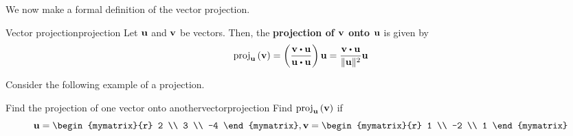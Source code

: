 We now make a formal definition of the vector projection.

\begin{definition}{Vector projection}{projection}
Let ${\bf u}$ and ${\bf v}$ be vectors. Then, the \textbf{projection of ${\bf v}$ onto
${\bf u}$} is given by 
\begin{equation*}
\func{proj}_{\vect{u}}\tup{\vect{v}} =\tup{\vspace{0.05in}
\frac{\vect{v}\dotprod \vect{u}}{\vect{u}\dotprod \vect{u}}} \vect{u}
=
\frac{\vect{v}\dotprod \vect{u}}{\norm{\vect{u}} ^{2}}\vect{u}
\end{equation*}
\end{definition}

Consider the following example of a projection.

\begin{example}{Find the projection of one vector onto another}{vectorprojection}
Find 
$\mbox{proj}_{{\bf u}}\left({\bf v}\right) $ if 
\begin{equation*}
\vect{u}=
\begin{mymatrix}{r}
2 \\
3 \\
-4
\end{mymatrix},
\vect{v}=
\begin{mymatrix}{r}
1 \\
-2 \\
1
\end{mymatrix}
\end{equation*}
\end{example}

